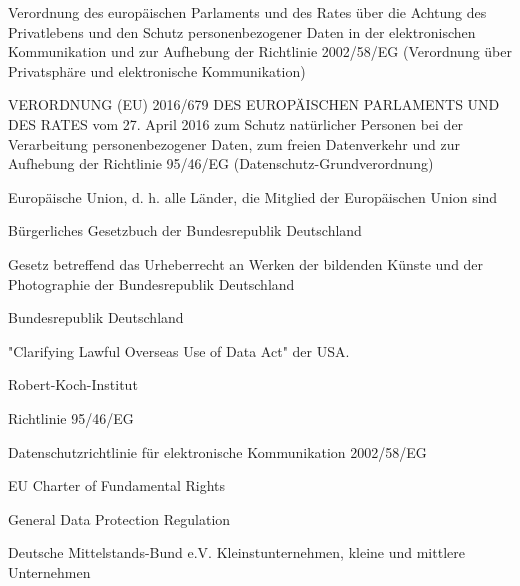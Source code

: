 {
    Verordnung des europäischen Parlaments und des Rates über die Achtung des
Privatlebens und den Schutz personenbezogener Daten in der elektronischen
Kommunikation und zur Aufhebung der Richtlinie 2002/58/EG (Verordnung über
Privatsphäre und elektronische Kommunikation)
}

{
    VERORDNUNG (EU) 2016/679 DES EUROPÄISCHEN PARLAMENTS UND DES RATES vom 27. April 2016 zum Schutz natürlicher Personen bei der Verarbeitung personenbezogener Daten, zum freien Datenverkehr und zur Aufhebung der Richtlinie 95/46/EG (Datenschutz-Grundverordnung)
}

{  
    Europäische Union, d. h. alle Länder, die Mitglied der Europäischen Union sind
}

{
    Bürgerliches Gesetzbuch der Bundesrepublik Deutschland
}

{
    Gesetz betreffend das Urheberrecht an Werken der bildenden Künste und der Photographie der Bundesrepublik Deutschland
}

{
    Bundesrepublik Deutschland
}

{
    "Clarifying Lawful Overseas Use of Data Act" der USA.
}

{
    Robert-Koch-Institut
}

{
    Richtlinie 95/46/EG
}

{
    Datenschutzrichtlinie für elektronische Kommunikation 2002/58/EG
}

{
    EU Charter of Fundamental Rights
}

{
    General Data Protection Regulation
}

{
    Deutsche Mittelstands-Bund e.V.
}
{
    Kleinstunternehmen, kleine und mittlere Unternehmen
}

\pagebreak

